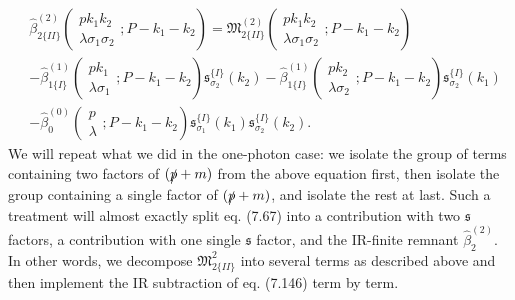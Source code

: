 \begin{align}
&\hat{\beta}^{(2)}_{2\{II\}}\left(\begin{array}{c}
pk_1k_2\\\lambda\sigma_1\sigma_2
\end{array};P-k_1-k_2\right)
=\mathfrak{M}^{(2)}_{2\{II\}}\left(\begin{array}{c}
pk_1k_2\\\lambda\sigma_1\sigma_2
\end{array};P-k_1-k_2\right)\nonumber\\
&-\hat{\beta}^{(1)}_{1\{I\}}\left(\begin{array}{c}
pk_1\\\lambda\sigma_1
\end{array};P-k_1-k_2\right)\mathfrak{s}^{\{I\}}_{\sigma_2}(k_2)-\hat{\beta}^{(1)}_{1\{I\}}\left(\begin{array}{c}
pk_2\\\lambda\sigma_2
\end{array};P-k_1-k_2\right)\mathfrak{s}^{\{I\}}_{\sigma_2}(k_1)\nonumber\\
&-\hat{\beta}^{(0)}_{0}\left(\begin{array}{c}
p\\\lambda
\end{array};P-k_1-k_2\right)\mathfrak{s}^{\{I\}}_{\sigma_1}(k_1)\mathfrak{s}^{\{I\}}_{\sigma_2}(k_2).
\end{align}
We will repeat what we did in the one-photon case:  we isolate the group of terms containing two factors of $(\slashed p +m)$ from the above equation first, then isolate the group containing a single factor of $(\slashed p +m)$, and isolate the rest at last. Such a treatment will almost exactly split eq. (7.67) into a contribution with two $\mathfrak{s}$ factors, a contribution with one single $\mathfrak{s}$ factor, and the IR-finite remnant $\hat{\beta}^{(2)}_2$. In other words, we decompose $\mathfrak{M}^{2}_{2\{II\}}$ into several terms as described above and then implement the IR subtraction of eq. (7.146) term by term.

